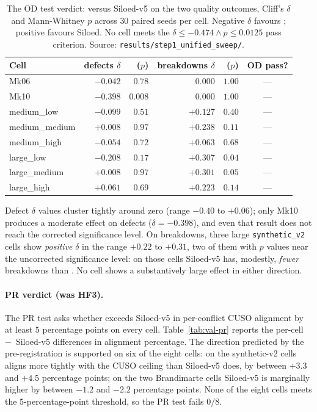 \begin{table}[ht]
\centering
\caption{The OD test verdict: \NEXUS{} versus Siloed-v5 on the two
quality outcomes, Cliff's $\delta$ and Mann-Whitney $p$ across
$30$ paired seeds per cell. Negative $\delta$ favours \NEXUS{};
positive favours Siloed. No cell meets the
$\delta \le -0.474 \wedge p \le 0.0125$ pass criterion. Source:
\texttt{results/step1\_unified\_sweep/}.}
\label{tab:val-od}
\small
\begin{tabularx}{\textwidth}{@{}l r r r r c@{}}
\toprule
\textbf{Cell} & \textbf{defects $\delta$} & \textbf{($p$)}
              & \textbf{breakdowns $\delta$} & \textbf{($p$)}
              & \textbf{OD pass?} \\
\midrule
Mk06            & $-0.042$ & $0.78$  & $\phantom{+}0.000$ & $1.00$  & --- \\
Mk10            & $-0.398$ & $0.008$ & $\phantom{+}0.000$ & $1.00$  & --- \\
medium\_low     & $-0.099$ & $0.51$  & $+0.127$           & $0.40$  & --- \\
medium\_medium  & $+0.008$ & $0.97$  & $+0.238$           & $0.11$  & --- \\
medium\_high    & $-0.054$ & $0.72$  & $+0.063$           & $0.68$  & --- \\
large\_low      & $-0.208$ & $0.17$  & $+0.307$           & $0.04$  & --- \\
large\_medium   & $+0.008$ & $0.97$  & $+0.301$           & $0.05$  & --- \\
large\_high     & $+0.061$ & $0.69$  & $+0.223$           & $0.14$  & --- \\
\bottomrule
\end{tabularx}
\end{table}

Defect $\delta$ values cluster tightly around zero (range
$-0.40$ to $+0.06$); only Mk10 produces a moderate effect on
defects ($\delta = -0.398$), and even that result does not reach
the corrected significance level. On breakdowns, three large
\texttt{synthetic\_v2} cells show \emph{positive} $\delta$ in the
range $+0.22$ to $+0.31$, two of them with $p$ values near the
uncorrected significance level: on those cells Siloed-v5 has,
modestly, \emph{fewer} breakdowns than \NEXUS{}. No cell shows a
substantively large effect in either direction.

\paragraph{PR verdict (was HF3).}
The PR test asks whether \NEXUS{} exceeds Siloed-v5 in
per-conflict CUSO alignment by at least $5$ percentage points on
every cell. Table~\ref{tab:val-pr} reports the per-cell
\NEXUS{}~$-$~Siloed-v5 differences in alignment percentage. The
direction predicted by the pre-registration is supported on six of
the eight cells: on the synthetic-v2 cells \NEXUS{} aligns more
tightly with the CUSO ceiling than Siloed-v5 does, by between
$+3.3$ and $+4.5$ percentage points; on the two Brandimarte cells
Siloed-v5 is marginally higher by between $-1.2$ and $-2.2$
percentage points. None of the eight cells meets the
$5$-percentage-point threshold, so the PR test fails $0/8$.

